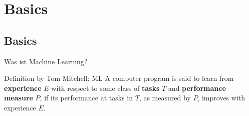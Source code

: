 \section{Basics}
\subsection{Basics}

\begin{frame}{Was ist Machine Learning?}
    \begin{block}{Definition by Tom Mitchell: ML}
        A computer program is said to learn from \textbf{experience} $E$ with
        respect to some class of \textbf{tasks} $T$ and \textbf{performance
        measure} $P$, if its performance at tasks in $T$, as measured by $P$,
        improves with experience $E$.
    \end{block}
\end{frame}

